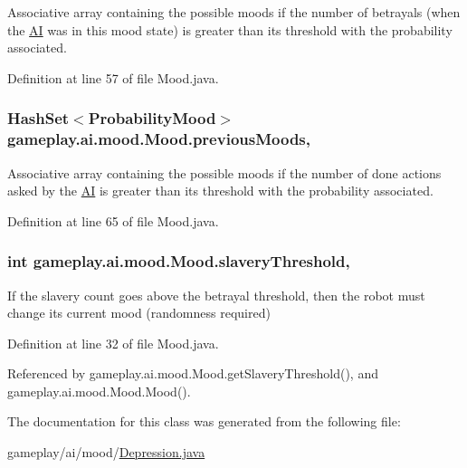 Associative array containing the possible moods if the number of betrayals (when the \hyperlink{a00001}{A\-I} was in this mood state) is greater than its threshold with the probability associated. 



Definition at line 57 of file Mood.\-java.

\hypertarget{a00015_a5c8758b18bb740a2fd1edf8d57a5ab27}{
\subsubsection[{previous\-Moods}]{\setlength{\rightskip}{0pt plus 5cm}Hash\-Set$<${\bf Probability\-Mood}$>$ gameplay.\-ai.\-mood.\-Mood.\-previous\-Moods\hspace{0.3cm}{\ttfamily [protected]}, {\ttfamily [inherited]}}}\label{a00015_a5c8758b18bb740a2fd1edf8d57a5ab27}


Associative array containing the possible moods if the number of done actions asked by the \hyperlink{a00001}{A\-I} is greater than its threshold with the probability associated. 



Definition at line 65 of file Mood.\-java.

\hypertarget{a00015_a12c9abed7c077f9013956cda08e41619}{
\subsubsection[{slavery\-Threshold}]{\setlength{\rightskip}{0pt plus 5cm}int gameplay.\-ai.\-mood.\-Mood.\-slavery\-Threshold\hspace{0.3cm}{\ttfamily [protected]}, {\ttfamily [inherited]}}}\label{a00015_a12c9abed7c077f9013956cda08e41619}


If the slavery count goes above the betrayal threshold, then the robot must change its current mood (randomness required) 



Definition at line 32 of file Mood.\-java.



Referenced by gameplay.\-ai.\-mood.\-Mood.\-get\-Slavery\-Threshold(), and gameplay.\-ai.\-mood.\-Mood.\-Mood().



The documentation for this class was generated from the following file\-:\begin{DoxyCompactItemize}
\item 
gameplay/ai/mood/\hyperlink{a00046}{Depression.\-java}\end{DoxyCompactItemize}

